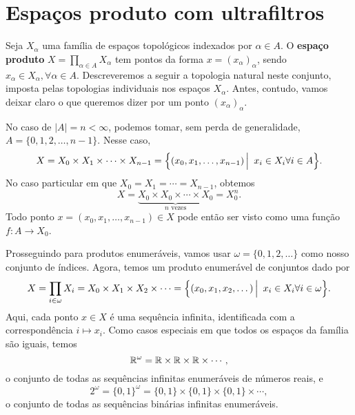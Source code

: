 \section{Espaços produto com ultrafiltros}
\label{sec:esp_produto}
 
 
 Seja 
 $X_{\alpha}$
 uma família de espaços topológicos indexados por
 $\alpha \in A$.
 O \textbf{espaço produto}
 $X = \displaystyle{ \prod_{\alpha \in A} X_{\alpha} }$
 tem pontos da forma
 $x = (x_{\alpha})_{\alpha}$,
 sendo 
 $x_{\alpha} \in X_{\alpha}, \forall \alpha \in A.$
 Descreveremos a seguir a topologia natural neste conjunto,
 imposta pelas topologias individuais nos espaços
 $X_{\alpha}$.
 Antes, contudo, vamos deixar claro o que queremos dizer por um ponto
 $(x_{\alpha})_{\alpha}$.
 
 No caso de
 $|A| = n < \infty$,
 podemos tomar, sem perda de generalidade,
 $A = \{ 0, 1, 2, \dots, n-1 \}$.
 Nesse caso,
 \begin{equation*}
     X 
     = 
     X_0 \times X_1 \times \cdots \times X_{n-1}
     =
     \setsuchthat{ (x_0, x_1, \dots, x_{n-1}) }{ x_i \in X_i \forall i \in A }.
 \end{equation*}
 No caso particular em que
 $X_0 = X_1 = \cdots = X_{n-1}$,
 obtemos
 \begin{equation*}
     X 
     = 
     \underbrace{ X_0 \times X_0 \times \cdots \times X_0 }_{n \text{ vezes}}
     =
     X_0^n.
 \end{equation*}
 Todo ponto
 $x = (x_0, x_1, \dots, x_{n-1}) \in X$
 pode então ser visto como uma função
 $f: A \to X_0$.
 
 Prosseguindo para produtos enumeráveis,
 vamos usar
 $\omega = \{ 0, 1, 2, \dots \}$
 como nosso conjunto de índices.
 Agora, temos um produto enumerável de conjuntos dado por
 \begin{equation*}
     X
     =
     \prod_{i \in \omega} X_i
     =
     X_0 \times X_1 \times X_2 \times \cdots
     =
     \setsuchthat{ (x_0, x_1, x_2, \dots) }{ x_i \in X_i \forall i \in \omega }.
 \end{equation*}
 Aqui, cada ponto
 $x \in X$
 é uma sequência infinita,
 identificada com a correspondência
 $i \mapsto x_i$.
 Como casos especiais em que todos os espaços da família são iguais, 
 temos
 \begin{equation*}
     \mathbb{R}^{\omega}
     =
     \mathbb{R} \times \mathbb{R} \times \mathbb{R} \times \cdots,
 \end{equation*}
 o conjunto de todas as sequências infinitas enumeráveis de números reais,
 e
 \begin{equation*}
     2^{\omega}
     =
     \{ 0,1 \}^{\omega}
     =
     \{ 0,1 \} \times \{ 0,1 \} \times \{ 0,1 \} \times \cdots,
 \end{equation*}
 o conjunto de todas as sequências binárias infinitas enumeráveis.
 
